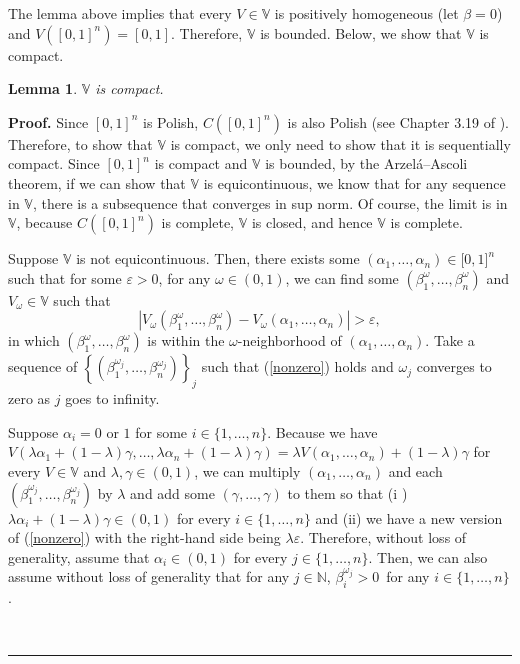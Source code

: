 \documentclass[12pt, notitlepage]{article}
\newtheorem{lemma}{Lemma}
\newenvironment{proof}[1][Proof]{\noindent\textbf{#1.} }{\ \rule{0.5em}{0.5em}}
\begin{document}
The lemma above implies that every $V\in \mathbb{V}$ is positively
homogeneous (let $\beta =0$) and {$V([0,1]^{n})=[0,1]$. Therefore, $\mathbb{V%
}$ is bounded. Below, we show that $\mathbb{V}$ is compact.}

\begin{lemma}
\label{compact}{$\mathbb{V}$ is compact.}
\end{lemma}

\begin{proof}
{Since $[0,1]^{n}$ is Polish, $C([0,1]^{n})$ is also Polish (see Chapter
3.19 of \cite{AliprantisBorder06}). Therefore, to show that $\mathbb{V}$ is
compact, we only need to show that it is sequentially compact. Since $%
[0,1]^{n}$ is compact and $\mathbb{V}$ is bounded, by the Arzel\'{a}--Ascoli
theorem, if we can show that $\mathbb{V}$ is equicontinuous, we know that
for any sequence in $\mathbb{V}$, there is a subsequence that converges in
sup norm. Of course, the limit is in $\mathbb{V}$, because $C([0,1]^{n})$ is
complete, $\mathbb{V}$ is closed, and hence $\mathbb{V}$ is complete.}

{Suppose $\mathbb{V}$ is not equicontinuous. Then, there exists some $%
(\alpha _{1},\dots ,\alpha _{n})\in \lbrack 0,1]^{n}$ such that for some $%
\varepsilon >0$, for any $\omega \in (0,1)$, we can find some $(\beta
_{1}^{\omega },\dots ,\beta _{n}^{\omega })$ and $V_{\omega }\in \mathbb{V}$
such that%
\begin{equation}
|V_{\omega }(\beta _{1}^{\omega },\dots ,\beta _{n}^{\omega })-V_{\omega
}(\alpha _{1},\dots ,\alpha _{n})|>\varepsilon ,  \label{nonzero}
\end{equation}%
in which $(\beta _{1}^{\omega },\dots ,\beta _{n}^{\omega })$ is within the $%
\omega $-neighborhood of $(\alpha _{1},\dots ,\alpha _{n})$. Take a sequence
of $\left\{ \left( \beta _{1}^{\omega _{j}},\dots ,\beta _{n}^{\omega
_{j}}\right) \right\} _{j}$ such that (\ref{nonzero}) holds and $\omega _{j}$
converges to zero as }$j$ goes to infinity{.}

Suppose $\alpha _{i}=0$ or $1$ for some $i\in \{1,\dots ,n\}$. Because we
have $V(\lambda \alpha _{1}+(1-\lambda )\gamma ,\dots ,\lambda \alpha
_{n}+(1-\lambda )\gamma )=\lambda V(\alpha _{1},\dots ,\alpha
_{n})+(1-\lambda )\gamma $ for every $V\in \mathbb{V}$ and $\lambda ,\gamma
\in (0,1)$, we can multiply {$(\alpha _{1},\dots ,\alpha _{n})$ and each }$%
\left( \beta _{1}^{\omega _{j}},\dots ,\beta _{n}^{\omega _{j}}\right) $ by $%
\lambda $ and add some $(\gamma ,\dots ,\gamma )$ to them so that (\textrm{i}%
) $\lambda \alpha _{i}+(1-\lambda )\gamma \in (0,1)$ for every $i\in
\{1,\dots ,n\}$ and (\textrm{ii}) we have a new version of (\ref{nonzero})
with the right-hand side being $\lambda \varepsilon $. Therefore, without
loss of generality, assume that {$\alpha _{i}\in (0,1)$ for every }$j\in
\{1,\dots ,n\}${. Then, we can also assume without loss of generality} that
for any $j\in \mathbb{N}$, $\beta _{i}^{\omega _{j}}>0${\ for any }$i\in
\{1,\dots ,n\}$.


\end{proof}
\end{document}
